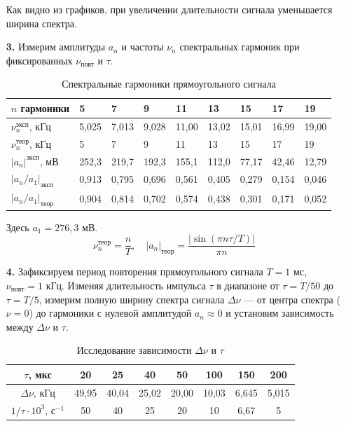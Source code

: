 \documentclass[a4paper,12pt]{article}
\begin{document}
\begin{enumerate}
Как видно из графиков, при увеличении длительности сигнала уменьшается ширина спектра.

\item [\textbf{3.}] Измерим амплитуды $a_n$ и частоты $\nu_n$ спектральных гармоник при фиксированных $\nu_\text{повт}$ и $\tau$.

\begin{table}[!h]
\centering
\begin{tabular}{|l|l|l|l|l|l|l|l|l|}
\hline
$n$ гармоники & 5 & 7 & 9 & 11 & 13 & 15 & 17 & 19 \\ \hline
$\nu_n^\text{эксп}$, кГц & 5,025 & 7,013 & 9,028 & 11,00 & 13,02 & 15,01 & 16,99 & 19,00 \\ \hline
$\nu_n^\text{теор}$, кГц & 5 & 7 & 9 & 11 & 13 & 15 & 17 & 19 \\ \hline
$|a_n|^\text{эксп}$, мВ & 252,3 & 219,7 & 192,3 & 155,1 & 112,0 & 77,17 & 42,46 & 12,79 \\ \hline
$|a_n/a_1|_\text{эксп}$ & 0,913 & 0,795 & 0,696 & 0,561 & 0,405 & 0,279 & 0,154 & 0,046 \\ \hline
$|a_n/a_1|_\text{теор}$ & 0,904 & 0,814 & 0,702 & 0,574 & 0,438 & 0,301 & 0,171 & 0,052 \\ \hline
\end{tabular}
\caption{Спектральные гармоники прямоугольного сигнала}
\end{table}

Здесь $a_1 = 276,3$ мВ.
\[
\nu_n^\text{теор} = \frac{n}{T}, \quad |a_n|_\text{теор} = \frac{|\sin(\pi n \tau / T)|}{\pi n}
\]

\item[\textbf{4.}] Зафиксируем период повторения прямоугольного сигнала $T = 1$ мс, $\nu_\text{повт} = 1$ кГц. Изменяя длительность импульса $\tau$ в диапазоне от $\tau=T/50$ до $\tau=T/5$, измерим полную ширину спектра сигнала $\Delta \nu$ — от центра спектра ($\nu = 0$) до гармоники с нулевой амплитудой $a_n \approx 0$ и установим зависимость между $\Delta \nu$ и $\tau$.

\begin{table}[h!]
\centering
\begin{tabular}{|c|c|c|c|c|c|c|c|}
\hline
$\tau$, мкс & 20 & 25 & 40 & 50 & 100 & 150 & 200 \\ \hline
$\Delta \nu$, кГц & 49,95 & 40,04 & 25,02 & 20,00 & 10,03 & 6,645 & 5,015 \\ \hline
$1/\tau \cdot 10^3$, с$^{-1}$ & 50 & 40 & 25 & 20 & 10 & 6,67 & 5 \\ \hline
\end{tabular}
\caption{Исследование зависимости $\Delta \nu$ и $\tau$}
\label{table2}
\end{table}


\end{enumerate}
\end{document}
